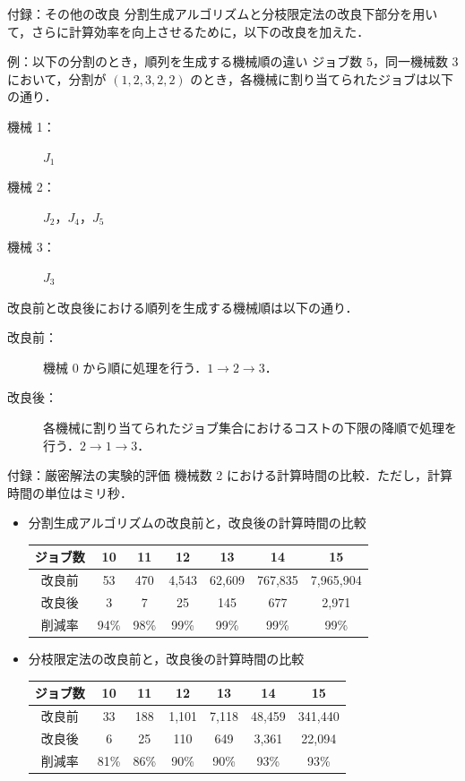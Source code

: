 \documentclass[dvipdfmx]{beamer}
\begin{document}
    \begin{frame}{付録：その他の改良}
      分割生成アルゴリズムと分枝限定法の改良下部分を用いて，さらに計算効率を向上させるために，以下の改良を加えた．
      \begin{exampleblock}{例：以下の分割のとき，順列を生成する機械順の違い}
        ジョブ数 $5$，同一機械数 $3$ において，分割が $(1,2,3,2,2)$ のとき，各機械に割り当てられたジョブは以下の通り．
        \begin{description}
          \item[機械 1：] $J_1$
          \item[機械 2：] $J_2$，$J_4$，$J_5$
          \item[機械 3：] $J_3$
        \end{description}
        改良前と改良後における順列を生成する機械順は以下の通り．
        \begin{description}
          \item[改良前：] 機械 $0$ から順に処理を行う．$1 \to 2 \to 3$．
          \item[改良後：] 各機械に割り当てられたジョブ集合におけるコストの下限の降順で処理を行う．$2 \to 1 \to 3$．
        \end{description}
      \end{exampleblock}
    \end{frame}

    \begin{frame}{付録：厳密解法の実験的評価}
      機械数 2 における計算時間の比較．ただし，計算時間の単位はミリ秒．
      \begin{itemize}
        \item 分割生成アルゴリズムの改良前と，改良後の計算時間の比較
        \begin{tabular}{|c|c|c|c|c|c|c|} \hline
          ジョブ数 & 10 & 11 & 12 & 13 & 14 & 15 \\ \hline \hline
          改良前 & 53 & 470 & 4,543 & 62,609 & 767,835 & 7,965,904\\ \hline
          改良後 & 3 & 7 & 25 & 145 & 677 & 2,971\\ \hline
          削減率 & 94\% & 98\% & 99\% & 99\% & 99\% & \alert{99\%} \\ \hline
        \end{tabular}
        \item 分枝限定法の改良前と，改良後の計算時間の比較
        \begin{tabular}{|c|c|c|c|c|c|c|} \hline
          ジョブ数 & 10 & 11 & 12 & 13 & 14 & 15\\ \hline \hline
          改良前 & 33 & 188 & 1,101 & 7,118 & 48,459 & 341,440 \\ \hline
          改良後 & 6 & 25 & 110 & 649 & 3,361 & 22,094 \\ \hline
          削減率 & 81\% & 86\% & 90\% & 90\% & 93\% & \alert{93\%} \\ \hline
        \end{tabular}
      \end{itemize}
    \end{frame}
\end{document}
